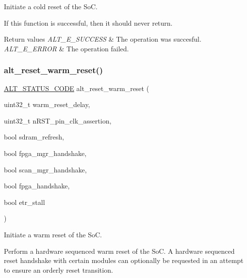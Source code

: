 Initiate a cold reset of the SoC.

If this function is successful, then it should never return.


\begin{DoxyRetVals}{Return values}
{\em A\+L\+T\+\_\+\+E\+\_\+\+S\+U\+C\+C\+E\+SS} & The operation was succesful. \\
\hline
{\em A\+L\+T\+\_\+\+E\+\_\+\+E\+R\+R\+OR} & The operation failed. \\
\hline
\end{DoxyRetVals}
\mbox{\label{group__RST__MGR__CTRL_gadc95a7b3024a7bed53740cb45d6b0d69}} 
\subsubsection{\texorpdfstring{alt\_reset\_warm\_reset()}{alt\_reset\_warm\_reset()}}
{\footnotesize\ttfamily \mbox{\hyperlink{hwlib_8h_abdb0d369f069723ca55d6c94bcaaaa12}{A\+L\+T\+\_\+\+S\+T\+A\+T\+U\+S\+\_\+\+C\+O\+DE}} alt\+\_\+reset\+\_\+warm\+\_\+reset (\begin{DoxyParamCaption}\item[{uint32\+\_\+t}]{warm\+\_\+reset\+\_\+delay,  }\item[{uint32\+\_\+t}]{n\+R\+S\+T\+\_\+pin\+\_\+clk\+\_\+assertion,  }\item[{bool}]{sdram\+\_\+refresh,  }\item[{bool}]{fpga\+\_\+mgr\+\_\+handshake,  }\item[{bool}]{scan\+\_\+mgr\+\_\+handshake,  }\item[{bool}]{fpga\+\_\+handshake,  }\item[{bool}]{etr\+\_\+stall }\end{DoxyParamCaption})}

Initiate a warm reset of the SoC.

Perform a hardware sequenced warm reset of the SoC. A hardware sequenced reset handshake with certain modules can optionally be requested in an attempt to ensure an orderly reset transition.


